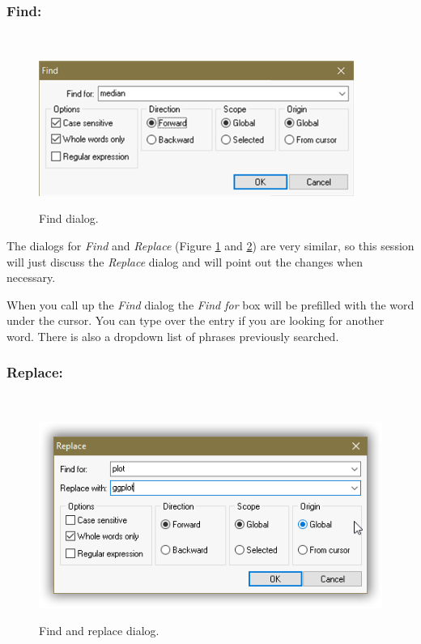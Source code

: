 \subsubsection{Find:}\\
\begin{figure}[H]
  \includegraphics[scale=1]{./res/dlg_find.png}\\
  \caption{Find dialog.}
  \label{fig:dlg_find}
\end{figure}

The dialogs for \textit{Find}
and \textit{Replace}
(Figure \ref{fig:dlg_find} and \ref{fig:dlg_replace})
are very similar, so this session will just discuss the \textit{Replace} dialog
and will point out the changes when necessary.

When you call up the \textit{Find} dialog
the \textit{Find for} box will be
prefilled with the word under the cursor. You can type over the entry if you
are looking for another word. There is also a dropdown list of phrases
previously searched.


\subsubsection{Replace:} \\
\begin{figure}[H]
  \includegraphics[scale=1]{./res/dlg_replace.png}\\
  \caption{Find and replace dialog.}
  \label{fig:dlg_replace}
\end{figure}

